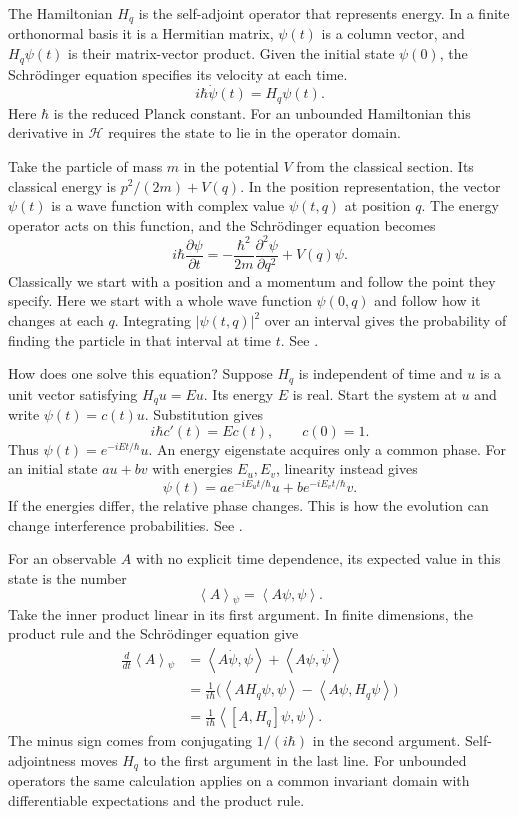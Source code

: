 The Hamiltonian $H_q$ is the self-adjoint
operator that represents energy. In a finite
orthonormal basis it is a Hermitian matrix,
$\psi(t)$ is a column vector, and
$H_q\psi(t)$ is their matrix-vector product.
Given the initial state $\psi(0)$, the
Schr\"odinger equation specifies its
velocity at each time.
$$
i\hbar\dot\psi(t)=H_q\psi(t).
$$
Here $\hbar$ is the reduced Planck constant.
For an unbounded Hamiltonian this derivative
in $\mathcal H$ requires the state to lie in
the operator domain.

Take the particle of mass $m$ in the
potential $V$ from the classical section.
Its classical energy is $p^2/(2m)+V(q)$.
In the position representation, the vector
$\psi(t)$ is a wave function with complex
value $\psi(t,q)$ at position $q$. The
energy operator acts on this function,
and the Schr\"odinger equation becomes
$$
i\hbar\frac{\partial\psi}{\partial t}
=-\frac{\hbar^2}{2m}
\frac{\partial^2\psi}{\partial q^2}
+V(q)\psi.
$$
Classically we start with a position and a
momentum and follow the point they specify.
Here we start with a whole wave function
$\psi(0,q)$ and follow how it changes at
each $q$. Integrating $|\psi(t,q)|^2$ over
an interval gives the probability of finding
the particle in that interval at time $t$.
See \cite[Sections 3.7.1 and 3.7.4]{hallq}.

How does one solve this equation? Suppose
$H_q$ is independent of time and $u$ is a
unit vector satisfying $H_qu=Eu$. Its energy
$E$ is real. Start the system at $u$ and
write $\psi(t)=c(t)u$. Substitution gives
$$
i\hbar c'(t)=Ec(t),\qquad c(0)=1.
$$
Thus $\psi(t)=e^{-iEt/\hbar}u$. An energy
eigenstate acquires only a common phase.
For an initial state $au+bv$ with energies
$E_u,E_v$, linearity instead gives
$$
\psi(t)=ae^{-iE_ut/\hbar}u
       +be^{-iE_vt/\hbar}v.
$$
If the energies differ, the relative phase
changes. This is how the evolution can
change interference probabilities. See
\cite[Sections 3.7.1--3.7.3]{hallq}.

For an observable $A$ with no explicit time
dependence, its expected value in this state
is the number
$$
\left\langle{} A \right\rangle{}_\psi
=\left\langle{} A\psi,\psi \right\rangle{}.
$$
Take the inner product linear in its first
argument. In finite dimensions, the product
rule and the Schr\"odinger equation give
$$
\begin{aligned}
\frac{d}{dt}
\left\langle{} A \right\rangle{}_\psi
&=\left\langle{} A\dot\psi,\psi
\right\rangle{}
 +\left\langle{} A\psi,\dot\psi
 \right\rangle{}\\
&=\frac{1}{i\hbar}\bigl(
  \left\langle{} AH_q\psi,\psi
  \right\rangle{}
 -\left\langle{} A\psi,H_q\psi
 \right\rangle{}\bigr)\\
&=\frac{1}{i\hbar}
  \left\langle{} [A,H_q]\psi,\psi
\right\rangle{} .
\end{aligned}
$$
The minus sign comes from conjugating
$1/(i\hbar)$ in the second argument.
Self-adjointness moves $H_q$ to the first
argument in the last line. For unbounded
operators the same calculation applies on a
common invariant domain with differentiable
expectations and the product rule.

